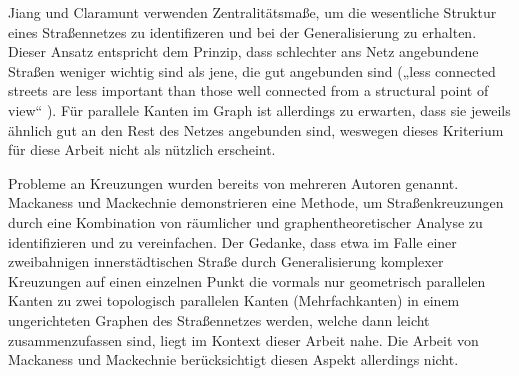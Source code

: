 \documentclass[../main/thesis.tex]{subfiles}
\begin{document}
Jiang und Claramunt verwenden Zentralitätsmaße, um die wesentliche Struktur eines Straßennetzes zu identifizeren und bei der Generalisierung zu erhalten.
Dieser Ansatz entspricht dem Prinzip, dass schlechter ans Netz angebundene Straßen weniger wichtig sind als jene, die gut angebunden sind („less connected streets are less important than those well connected from a structural point of view“ ). 
Für parallele Kanten im Graph ist allerdings zu erwarten, dass sie jeweils ähnlich gut an den Rest des Netzes angebunden sind, weswegen dieses Kriterium für diese Arbeit nicht als nützlich erscheint.


Probleme an Kreuzungen wurden bereits von mehreren Autoren genannt.
Mackaness und Mackechnie demonstrieren eine Methode, um Straßenkreuzungen durch eine Kombination von räumlicher und graphentheoretischer Analyse zu identifizieren und zu vereinfachen. 
Der Gedanke, dass etwa im Falle einer zweibahnigen innerstädtischen Straße durch Generalisierung komplexer Kreuzungen auf einen einzelnen Punkt die vormals nur geometrisch parallelen Kanten zu zwei topologisch parallelen Kanten (Mehrfachkanten) in einem ungerichteten Graphen des Straßennetzes werden, welche dann leicht zusammenzufassen sind, liegt im Kontext dieser Arbeit nahe.
Die Arbeit von Mackaness und Mackechnie berücksichtigt diesen Aspekt allerdings nicht.







\onlyinsubfile{\listoffigures} %
\end{document}
